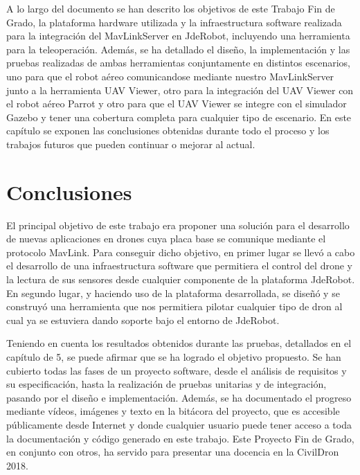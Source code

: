 A lo largo del documento se han descrito los objetivos de este Trabajo Fin de Grado, la plataforma hardware utilizada y la infraestructura software realizada para la integración del MavLinkServer en JdeRobot, incluyendo una herramienta para la teleoperación. Además, se ha detallado el diseño, la implementación y las pruebas realizadas de ambas herramientas conjuntamente en distintos escenarios, uno para que el robot aéreo comunicandose mediante nuestro MavLinkServer junto a la herramienta UAV Viewer, otro para la integración del UAV Viewer con el robot aéreo Parrot y otro para que el UAV Viewer se integre con el simulador Gazebo y tener una cobertura completa para cualquier tipo de escenario. En este capítulo se exponen las conclusiones obtenidas durante todo el proceso y los trabajos futuros que pueden continuar o mejorar al actual.

\section{Conclusiones}

El principal objetivo de este trabajo era proponer una solución para el desarrollo de nuevas aplicaciones en drones cuya placa base se comunique mediante el protocolo MavLink. Para conseguir dicho objetivo, en primer lugar se llevó a cabo el desarrollo de una infraestructura software que permitiera el control del drone y la lectura de sus sensores desde cualquier componente de la plataforma JdeRobot. En segundo lugar, y haciendo uso de la plataforma desarrollada, se diseñó y se construyó una herramienta que nos permitiera pilotar cualquier tipo de dron al cual ya se estuviera dando soporte bajo el entorno de JdeRobot.

Teniendo en cuenta los resultados obtenidos durante las pruebas, detallados en el capítulo de 5, se puede afirmar que se ha logrado el objetivo propuesto. Se han cubierto todas las fases de un proyecto software, desde el análisis de requisitos y su especificación, hasta la realización de pruebas unitarias y de integración, pasando por el diseño e implementación. Además, se ha documentado el progreso mediante vídeos, imágenes y texto en la bitácora del proyecto, que es accesible públicamente desde Internet y donde cualquier usuario puede tener acceso a toda la documentación y código generado en este trabajo. Este Proyecto Fin de Grado, en conjunto con otros, ha servido para presentar una docencia en la CivilDron 2018.

